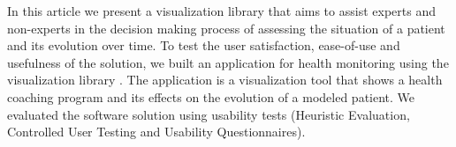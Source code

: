 \documentclass[twocolumn]{bmcart}%
\begin{document}

 
In this article we present a visualization library that aims to assist experts and non-experts in the decision making process of assessing the situation of a patient and its evolution over time. To test the user satisfaction, ease-of-use and usefulness of the solution, we built an application for health monitoring using the visualization library . The application is a visualization tool that shows a health coaching program and its effects on the evolution of a modeled patient. We evaluated the software solution using usability tests (Heuristic Evaluation, Controlled User Testing and Usability Questionnaires).  

\end{document}

